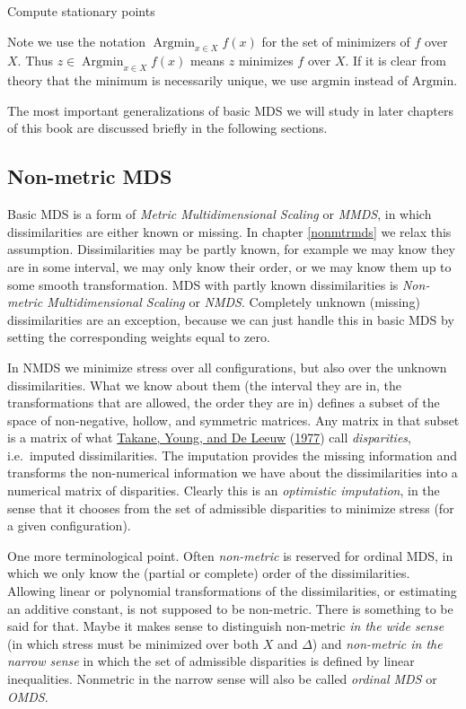 \documentclass[
  12pt,
]{book}
\theoremstyle{definition}
\theoremstyle{definition}
\theoremstyle{definition}
\theoremstyle{definition}
\theoremstyle{remark}
\begin{document}
Compute stationary points

Note we use the notation \(\mathop{\text{Argmin}}_{x\in X}f(x)\) for the set of minimizers of \(f\) over \(X\). Thus \(z\in\mathop{\text{Argmin}}_{x\in X}f(x)\) means \(z\) minimizes \(f\) over \(X\). If it is clear from theory that the minimum is necessarily unique, we use \(\text{argmin}\) instead of \(\text{Argmin}\).

The most important generalizations of basic MDS
we will study in later chapters of this book are discussed briefly in the following sections.

\hypertarget{gennonmetric}{%
\subsection{Non-metric MDS}\label{gennonmetric}}

Basic MDS is a form of \emph{Metric Multidimensional Scaling} or
\emph{MMDS}, in which dissimilarities are either known or missing. In chapter \ref{nonmtrmds} we relax this assumption. Dissimilarities may be partly known, for example we may know they are in some interval, we may only know their order, or we may know them up to some smooth transformation. MDS with partly known dissimilarities is \emph{Non-metric Multidimensional Scaling} or \emph{NMDS}. Completely unknown (missing) dissimilarities are an exception, because we can just handle this in basic MDS by setting the corresponding weights equal to zero.

In NMDS we minimize stress over all configurations, but also over the unknown dissimilarities. What we know about them (the interval they are in, the transformations that are allowed, the order they are in) defines a subset of the space of non-negative, hollow, and symmetric matrices. Any matrix in that subset is a matrix of what \protect\hyperlink{ref-takane_young_deleeuw_A_77}{Takane, Young, and De Leeuw} (\protect\hyperlink{ref-takane_young_deleeuw_A_77}{1977}) call \emph{disparities}, i.e.~imputed dissimilarities. The imputation provides the missing information and transforms the non-numerical information we have about the dissimilarities into a numerical matrix of disparities. Clearly this is an \emph{optimistic imputation}, in the sense that it chooses from the set of admissible disparities to minimize stress (for a given configuration).

One more terminological point. Often \emph{non-metric} is reserved for ordinal MDS, in which we only know the (partial or complete) order of the dissimilarities. Allowing linear or polynomial transformations of the dissimilarities, or estimating an additive constant, is not supposed to be non-metric. There is something to be said for that. Maybe it makes sense to distinguish non-metric \emph{in the wide sense} (in which stress must be minimized over both \(X\) and \(\Delta\)) and \emph{non-metric in the narrow sense} in which the set of admissible disparities is defined by linear inequalities. Nonmetric in the narrow sense will also be called \emph{ordinal MDS} or
\emph{OMDS}.
\end{document}
